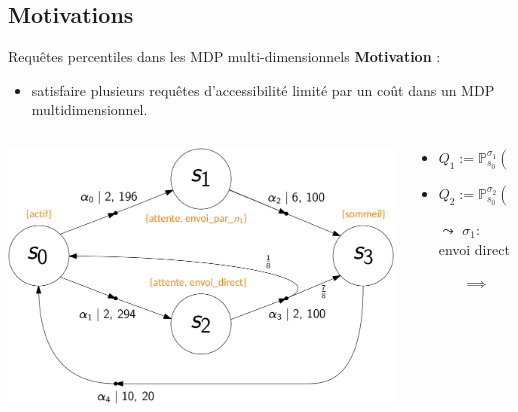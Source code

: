 \documentclass[compress]{beamer}
\begin{document}
\subsection{Motivations}
\begin{frame}{Requêtes percentiles dans les MDP multi-dimensionnels}
  \textbf{\color{fibeamer@orange}Motivation} :
  \begin{itemize}
    \item satisfaire plusieurs requêtes d'accessibilité limité par un coût dans
      un MDP multidimensionnel.
  \end{itemize}
  \begin{center}
    \begin{columns}
      \begin{column}{0.4\linewidth}
        \includegraphics[width=\linewidth]{resources/mdmdp2}
      \end{column}
      \begin{column}{0.6\linewidth}{\small
        \begin{itemize}
          \item $Q_1 := \mathbb{P}^{\sigma_1}_{s_0}(\Diamond_{1\, :\, \leq 4} \text{ sommeil}) \geq 0.8$
          \item $Q_2 := \mathbb{P}^{\sigma_2}_{s_0}(\Diamond_{2\, :\, \leq 700} \text{ sommeil}) \geq 0.9$
            \item[$\leadsto$] $\sigma_1 : $ envoi direct
            \begin{itemize}
              \item[$\implies$] 
            \end{itemize}

\end{itemize}}
\end{column}
\end{columns}
\end{center}
\end{frame}
\end{document}
